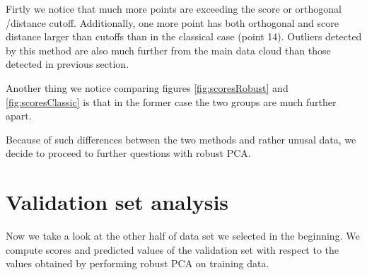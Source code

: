 \documentclass[12pt]{article}
\begin{document}
Firtly we notice that much more points are exceeding the score or orthogonal /distance cutoff. 
Additionally, one more point has both orthogonal and score distance larger than cutoffs than in the classical case (point 14). Outliers detected by this method
are also much further from the main data cloud than those detected in previous section.

Another thing we notice comparing figures \ref{fig:scoresRobust} and \ref{fig:scoresClassic} is that in the former case the two groups are much further apart.

Because of such differences between the two methods and rather unusal data, we decide to proceed to further questions with robust PCA.

\section{Validation set analysis}
Now we take a look at the other half of data set we selected in the beginning. We compute scores and
predicted values of the validation set with respect to the values obtained by performing robust PCA on training data.
\end{document}
